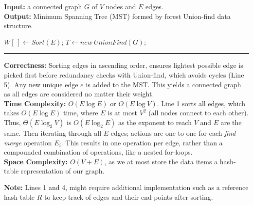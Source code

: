 \begin{Func}
    \textbf{Input:} a connected graph $G$ of $V$ nodes and $E$ edges.\\
    \textbf{Output:} Minimum Spanning Tree (MST) formed by forest Union-find data structure.\\

    \vspace{-.5em}
    \begin{algorithm}[H]
        \label{algo:prim}
        $W[\ ]\gets Sort(E)$; 
        $T\gets new \ UnionFind(G)$; 

        \vspace{.5em}
    \end{algorithm}
    \noindent\rule{\textwidth}{0.4pt}

    \noindent
    \textbf{Correctness:} Sorting edges in ascending order, ensures lightest possible edge is picked first before redundancy checks with Union-find, which avoids cycles (Line 5).
    Any new unique edge $e$ is added to the MST. This yields a connected graph as all edges are considered no matter their weight.\\
    \textbf{Time Complexity:} $O(E \log E)$ or $O(E \log V)$. Line 1 sorts all edges, which takes $O(E \log E)$ time, where $E$ is at most $V^2$ (all nodes connect to each other).
    Thus, $\Theta(E \log_2 V)$ is $O(E \log_2 E)$ as the exponent to reach $V$ and $E$ are the same. Then iterating through all $E$ edges; 
    actions are one-to-one for each \textit{find-merge} operation $E_i$. This results in one operation per edge, rather than a compounded combination of operations, like a nested for-loops.\\
    \textbf{Space Complexity:} $O(V+E)$, as we at most store the data items a hash-table representation of our graph.
\end{Func}

\noindent
\textbf{Note:} Lines 1 and 4, might require additional implementation such as a reference hash-table $R$ to keep track of edges and their end-points after sorting.